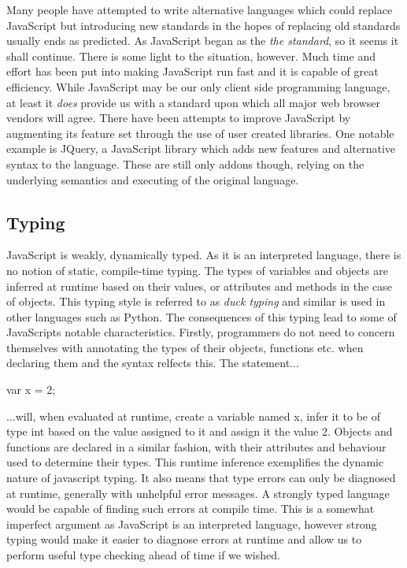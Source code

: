 Many people have attempted to
write alternative languages which could replace JavaScript but 
introducing new standards in the hopes of replacing old standards
usually ends as predicted. As JavaScript began as the \emph{the
standard}, so it seems it shall continue. There is some light to the
situation, however. Much time and effort has been put into making 
JavaScript run fast and it is capable of great efficiency. While 
JavaScript may be our only client side programming language, at least
it \emph{does} provide us with a standard upon which all major web 
browser vendors will agree. There have been attempts
to improve JavaScript by augmenting its feature set through the use
of user created libraries. One notable example is JQuery, a JavaScript
library which adds new features and alternative syntax to the language.
These are still only addons though, relying on the underlying semantics
and executing of the original language. 


\subsection{Typing}
JavaScript is weakly, dynamically typed. As it is an interpreted language,
there is no notion of static, compile-time typing. The types of variables
and objects are inferred at runtime based on their values, or attributes and
methods in the case of objects. This typing style is referred to as\emph{
duck typing} and similar is used in other languages such as Python. The
consequences of this typing lead to some of JavaScripts notable characteristics.
Firstly, programmers do not need to concern themselves with annotating the
types of their objects, functions etc. when declaring them and the syntax
relfects this. The statement...
\begin{center}
var x = 2;		
\end{center}
\noindent ...will, when evaluated at runtime, create a variable named x, infer
it to be of type int based on the value assigned to it and assign it the
value 2. Objects and functions are declared in a similar fashion, with their
attributes and behaviour used to determine their types. This runtime inference
exemplifies the dynamic nature of javascript typing. It also means that
type errors can only be diagnosed at runtime, generally with unhelpful 
error messages. A strongly typed language would be capable of finding such
errors at compile time. This is a somewhat imperfect argument as JavaScript
is an interpreted language, however strong typing would make it easier to
diagnose errors at runtime and allow us to perform useful type checking
ahead of time if we wished.

